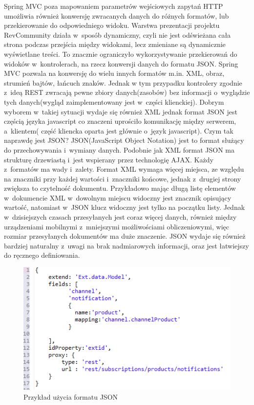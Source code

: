Spring MVC poza mapowaniem parametrów wejściowych zapytań HTTP umożliwia również konwersję zwracanych danych do różnych formatów, lub przekierowanie do odpowiedniego widoku. Warstwa prezentacji projektu RevCommunity działa w~sposób dynamiczny, czyli nie jest odświeżana cała strona podczas przejścia między widokami, lecz zmieniane są dynamicznie wyświetlane treści. To znacznie ograniczyło wykorzystywanie przekierowań do widoków w~kontrolerach, na rzecz konwersji danych do formatu JSON. Spring MVC pozwala na konwersję do wielu innych formatów m.in. XML, obraz, strumień bajtów, łańcuch znaków. Jednak w tym przypadku kontrolery zgodnie z~ideą REST zwracają pewne zbiory danych(zasobów) bez informacji o~wyglądzie tych danych(wygląd zaimplementowany jest w~części klienckiej). Dobrym wyborem w~takiej sytuacji wydaje się również XML jednak format JSON jest częścią języka javascript co znaczeni uprościło komunikację między serwerem, a~klientem( część kliencka oparta jest głównie o~język javascript).
Czym tak naprawdę jest JSON? JSON(JavaScript Object Notation) jest to format służący do przechowywania i~wymiany danych. Podobnie jak XML format JSON ma strukturę drzewiastą i~jest wspierany przez technologię AJAX. Każdy z~formatów ma wady i~zalety. Format XML wymaga więcej miejsca, ze względu na znaczniki przy każdej wartości i~znaczniki końcowe, jednak z~drugiej strony zwiększa to czytelność dokumentu. Przykładowo mając długą listę elementów w~dokumencie XML w~dowolnym miejscu widoczny jest znacznik opisujący wartość, natomiast w~JSON klucz widoczny jest tylko na początku listy. Jednak w~dzisiejszych czasach przesyłanych jest coraz więcej danych, również między urządzeniami mobilnymi z~mniejszymi możliwościami obliczeniowymi, więc rozmiar przesyłanych dokumentów ma duże znaczenie. JSON wydaje się również bardziej naturalny z~uwagi na brak nadmiarowych informacji, oraz jest łatwiejszy do ręcznego definiowania. 

\begin{figure}[H]
	\centering
	\includegraphics{images/json.png}
	\caption{Przykład użycia formatu JSON}
\end{figure}

